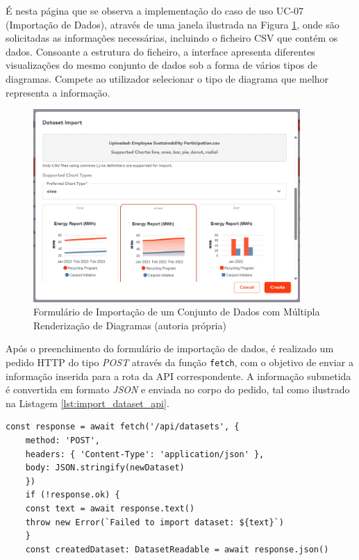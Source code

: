 É nesta página que se observa a implementação do caso de uso UC-07 (Importação de Dados), através de uma janela ilustrada na Figura \ref{fig:create_dataset}, onde são solicitadas as informações necessárias, incluindo o ficheiro CSV que contém os dados. Consoante a estrutura do ficheiro, a interface apresenta diferentes visualizações do mesmo conjunto de dados sob a forma de vários tipos de diagramas. Compete ao utilizador selecionar o tipo de diagrama que melhor representa a informação.

\begin{figure}[H]
    \centering
    \includegraphics[width=4in,keepaspectratio]{frontmatter/assets/platform_prints/dataset/dataset_import.png}
    \caption{Formulário de Importação de um Conjunto de Dados com Múltipla Renderização de Diagramas (autoria própria)}
    \label{fig:create_dataset}
\end{figure}

Após o preenchimento do formulário de importação de dados, é realizado um pedido HTTP do tipo \textit{POST} através da função \texttt{fetch}, com o objetivo de enviar a informação inserida para a rota da API correspondente. A informação submetida é convertida em formato \textit{JSON} e enviada no corpo do pedido, tal como ilustrado na Listagem \ref{lst:import_dataset_api}.

\begin{lstlisting}[style=customts, caption={Chamada à API de Importação de um Conjunto de Dados}, label={lst:import_dataset_api}]
    const response = await fetch('/api/datasets', {
    method: 'POST',
    headers: { 'Content-Type': 'application/json' },
    body: JSON.stringify(newDataset)
    })
    if (!response.ok) {
    const text = await response.text()
    throw new Error(`Failed to import dataset: ${text}`)
    }
    const createdDataset: DatasetReadable = await response.json()
\end{lstlisting}

